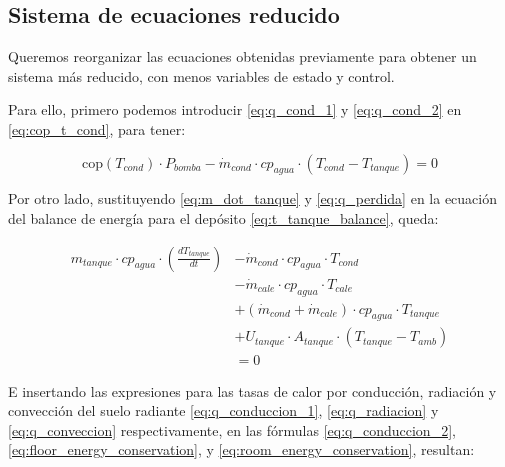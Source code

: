 \subsection{Sistema de ecuaciones reducido}

Queremos reorganizar las ecuaciones obtenidas previamente para obtener un
sistema más reducido, con menos variables de estado y control.

Para ello, primero podemos introducir \eqref{eq:q_cond_1} y \eqref{eq:q_cond_2}
en \eqref{eq:cop_t_cond}, para tener:

\begin{equation}
	\text{cop}(T_{cond}) \cdot P_{bomba} - \dot{m}_{cond} \cdot cp_{agua} \cdot \left(T_{cond} - T_{tanque}\right) = 0
\end{equation}

Por otro lado, sustituyendo \eqref{eq:m_dot_tanque} y \eqref{eq:q_perdida} en
la ecuación del balance de energía para el depósito
\eqref{eq:t_tanque_balance}, queda:

\begin{align}
	m_{tanque} \cdot cp_{agua} \cdot \left( \frac{dT_{tanque}}{dt} \right) & - \dot{m}_{cond} \cdot cp_{agua} \cdot T_{cond} \nonumber                      \\
	                                                                       & - \dot{m}_{cale} \cdot cp_{agua} \cdot T_{cale} \nonumber                      \\
	                                                                       & + (\dot{m}_{cond} + \dot{m}_{cale}) \cdot cp_{agua} \cdot T_{tanque} \nonumber \\
	                                                                       & + U_{tanque} \cdot A_{tanque} \cdot (T_{tanque} - T_{amb}) \nonumber           \\
	                                                                       & = 0
\end{align}


E insertando las expresiones para las tasas de calor por conducción, radiación
y convección del suelo radiante \eqref{eq:q_conduccion_1},
\eqref{eq:q_radiacion} y \eqref{eq:q_conveccion} respectivamente, en las
fórmulas \eqref{eq:q_conduccion_2}, \eqref{eq:floor_energy_conservation}, y
\eqref{eq:room_energy_conservation}, resultan:


